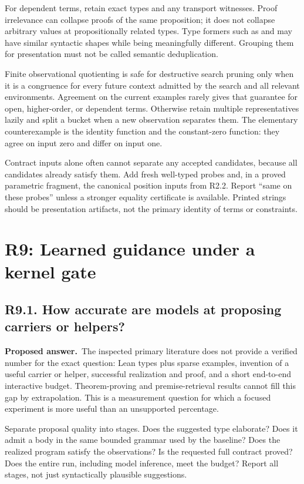 \documentclass[11pt,a4paper]{article}
\newcommand{\code}[1]{\texttt{\small\detokenize{#1}}}
\newcommand{\question}[2]{\subsection{#1. #2}\label{q:#1}}
\newcommand{\answer}{\textbf{Proposed answer.}\ }
\theoremstyle{remark}
\begin{document}
For dependent terms, retain exact types and any transport witnesses. Proof
irrelevance can collapse proofs of the same proposition; it does not collapse
arbitrary values at propositionally related types. Type formers such as
\code{fun _ => Empty} and \code{fun _ => Unit} may have similar syntactic
shapes while being meaningfully different. Grouping them for presentation
must not be called semantic deduplication.

Finite observational quotienting is safe for destructive search pruning only
when it is a congruence for every future context admitted by the search and
all relevant environments. Agreement on the current examples rarely gives
that guarantee for open, higher-order, or dependent terms. Otherwise retain
multiple representatives lazily and split a bucket when a new observation
separates them. The elementary counterexample is the identity function and
the constant-zero function: they agree on input zero and differ on input
one.

Contract inputs alone often cannot separate any accepted candidates, because
all candidates already satisfy them. Add fresh well-typed probes and, in a
proved parametric fragment, the canonical position inputs from R2.2.
Report ``same on these probes'' unless a stronger equality certificate is
available. Printed strings should be presentation artifacts, not the primary
identity of terms or constraints.

\section{R9: Learned guidance under a kernel gate}
\label{sec:r9}

\question{R9.1}{How accurate are models at proposing carriers or helpers?}

\answer The inspected primary literature does not provide a verified number
for the exact question: Lean types plus sparse examples, invention of a
useful carrier or helper, successful realization and proof, and a short
end-to-end interactive budget. Theorem-proving and premise-retrieval results
cannot fill this gap by extrapolation.\cite{leanhammer,canonical}
This is a measurement question for which a focused experiment is more useful
than an unsupported percentage.

Separate proposal quality into stages. Does the suggested type elaborate?
Does it admit a body in the same bounded grammar used by the baseline?
Does the realized program satisfy the observations? Is the requested full
contract proved? Does the entire run, including model inference, meet the
budget? Report all stages, not just syntactically plausible suggestions.
\end{document}
